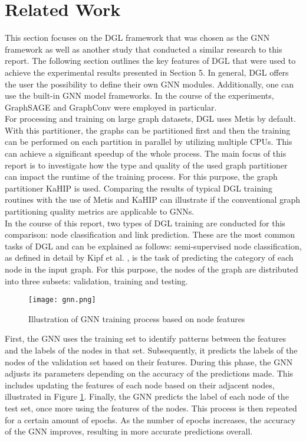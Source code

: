 \documentclass[acmsmall,nonacm,screen,review]{acmart}
\begin{document}
\section{Related Work}
This section focuses on the DGL framework that was chosen as the GNN framework as well as another study that conducted a similar research to this report. The following section outlines the key features of DGL that were used to achieve the experimental results presented in Section 5. In general, DGL offers the user the possibility to define their own GNN modules. Additionally, one can use the built-in GNN model frameworks. In the course of the experiments, GraphSAGE \cite{GraphSAGE} and GraphConv \cite{NC} were employed in particular. \\
For processing and training on large graph datasets, DGL uses Metis by default. With this partitioner, the graphs can be partitioned first and then the training can be performed on each partition in parallel by utilizing multiple CPUs. This can achieve a significant speedup of the whole process. The main focus of this report is to investigate how the type and quality of the used graph partitioner can impact the runtime of the training process. For this purpose, the graph partitioner KaHIP is used. Comparing the results of typical DGL training routines with the use of Metis and KaHIP can illustrate if the conventional graph partitioning quality metrics are applicable to GNNs. \\
In the course of this report, two types of DGL training are conducted for this comparison: node classification and link prediction. These are the most common tasks of DGL and can be explained as follows: semi-supervised node classification, as defined in detail by Kipf et al. \cite{NC}, is the task of predicting the category of each node in the input graph. For this purpose, the nodes of the graph are distributed into three subsets: validation, training and testing. \\  
\begin{figure}[bt!]
    \centering
    \texttt{[image: gnn.png]}
    \caption{Illustration of GNN training process based on node features}
    \label{learning}
\end{figure}
First, the GNN uses the training set to identify patterns between the features and the labels of the nodes in that set. Subsequently, it predicts the labels of the nodes of the validation set based on their features. During this phase, the GNN adjusts its parameters depending on the accuracy of the predictions made. This includes updating the features of each node based on their adjacent nodes, illustrated in Figure \ref{learning}. Finally, the GNN predicts the label of each node of the test set, once more using the features of the nodes. This process is then repeated for a certain amount of epochs. As the number of epochs increases, the accuracy of the GNN improves, resulting in more accurate predictions overall. \\
\end{document}
